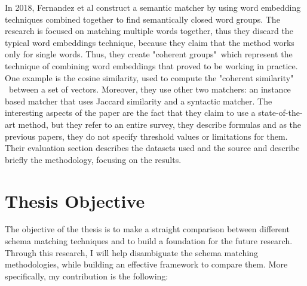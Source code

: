 \documentclass[a4paper]{article}
\begin{document}
In 2018, Fernandez et al \cite{fernandez2018seeping} construct a semantic matcher by using word embedding techniques combined together to find semantically closed word groups. The research is focused on matching multiple words together, thus they discard the typical word embeddings technique, because they claim that the method works only for single words. Thus, they create "coherent groups"\ which represent the technique of combining word embeddings that proved to be working in practice. One example is the cosine similarity, used to compute the "coherent similarity" \ between a set of vectors. Moreover, they use other two matchers: an instance based matcher that uses Jaccard similarity and a syntactic matcher. The interesting aspects of the paper are the fact that they claim to use a state-of-the-art method, but they refer to an entire survey, they describe formulas and as the previous papers, they do not specify threshold values or limitations for them. Their evaluation section describes the datasets used and the source and describe briefly the methodology, focusing on the results. 


\section{Thesis Objective}

The objective of the thesis is to make a straight comparison between different schema matching techniques and to build a foundation for the future research. Through this research, I will help disambiguate the schema matching methodologies, while building an effective framework to compare them. More specifically, my contribution is the following: 
\end{document}
